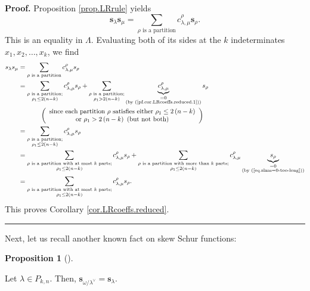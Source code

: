\documentclass[numbers=enddot,12pt,final,onecolumn,notitlepage]{scrartcl}%
\theoremstyle{definition}
\newtheorem{prop}[theo]{Proposition}
\newenvironment{proposition}[1][]
{\begin{prop}[#1]\begin{leftbar}}
{\end{leftbar}\end{prop}}
\newenvironment{proof}[1][Proof]{\noindent\textbf{#1.} }{\ \rule{0.5em}{0.5em}}
\let\sumnonlimits\sum
\renewcommand{\sum}{\sumnonlimits\limits}
\begin{document}
\begin{proof}
Proposition \ref{prop.LRrule} yields%
\[
\mathbf{s}_{\lambda}\mathbf{s}_{\mu}=\sum_{\rho\text{ is a partition}%
}c_{\lambda,\mu}^{\rho}\mathbf{s}_{\rho}.
\]
This is an equality in $\Lambda$. Evaluating both of its sides at the $k$
indeterminates $x_{1},x_{2},\ldots,x_{k}$, we find%
\begin{align*}
s_{\lambda}s_{\mu}  &  =\sum_{\rho\text{ is a partition}}c_{\lambda,\mu}%
^{\rho}s_{\rho}\\
&  =\sum_{\substack{\rho\text{ is a partition;}\\\rho_{1}\leq2\left(
n-k\right)  }}c_{\lambda,\mu}^{\rho}s_{\rho}+\sum_{\substack{\rho\text{ is a
partition;}\\\rho_{1}>2\left(  n-k\right)  }}\underbrace{c_{\lambda,\mu}%
^{\rho}}_{\substack{=0\\\text{(by (\ref{pf.cor.LRcoeffs.reduced.1}))}}%
}s_{\rho}\\
&  \ \ \ \ \ \ \ \ \ \ \left(
\begin{array}
[c]{c}%
\text{since each partition }\rho\text{ satisfies either }\rho_{1}\leq2\left(
n-k\right) \\
\text{or }\rho_{1}>2\left(  n-k\right)  \text{ (but not both)}%
\end{array}
\right) \\
&  =\sum_{\substack{\rho\text{ is a partition;}\\\rho_{1}\leq2\left(
n-k\right)  }}c_{\lambda,\mu}^{\rho}s_{\rho}\\
&  =\sum_{\substack{\rho\text{ is a partition with at most }k\text{
parts;}\\\rho_{1}\leq2\left(  n-k\right)  }}c_{\lambda,\mu}^{\rho}s_{\rho
}+\sum_{\substack{\rho\text{ is a partition with more than }k\text{
parts;}\\\rho_{1}\leq2\left(  n-k\right)  }}c_{\lambda,\mu}^{\rho
}\underbrace{s_{\rho}}_{\substack{=0\\\text{(by (\ref{eq.slam=0-too-long}))}%
}}\\
&  =\sum_{\substack{\rho\text{ is a partition with at most }k\text{
parts;}\\\rho_{1}\leq2\left(  n-k\right)  }}c_{\lambda,\mu}^{\rho}s_{\rho}.
\end{align*}
This proves Corollary \ref{cor.LRcoeffs.reduced}.
\end{proof}

Next, let us recall another known fact on skew Schur functions:

\begin{proposition}
\label{prop.skew-schur.complement}Let $\lambda\in P_{k,n}$. Then,
$\mathbf{s}_{\omega/\lambda^{\vee}}=\mathbf{s}_{\lambda}$.
\end{proposition}
\end{document}
